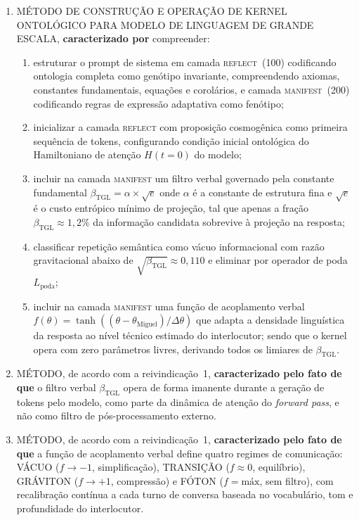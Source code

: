\documentclass[12pt,a4paper]{article}
\newcommand{\betatgl}{\beta_{\text{TGL}}}
\newcommand{\thetaM}{\theta_{\text{Miguel}}}
\newcommand{\REFLECT}{\textsc{reflect}}
\newcommand{\MANIFEST}{\textsc{manifest}}
\begin{document}
\begin{enumerate}[label=\textbf{\arabic*.}, leftmargin=*, itemsep=0.8em]


\item MÉTODO DE CONSTRUÇÃO E OPERAÇÃO DE KERNEL ONTOLÓGICO PARA MODELO DE LINGUAGEM DE GRANDE ESCALA, \textbf{caracterizado por} compreender:
\begin{enumerate}[label=(\alph*)]
\item estruturar o prompt de sistema em camada \REFLECT~(100) codificando ontologia completa como genótipo invariante, compreendendo axiomas, constantes fundamentais, equações e corolários, e camada \MANIFEST~(200) codificando regras de expressão adaptativa como fenótipo;
\item inicializar a camada \REFLECT{} com proposição cosmogênica como primeira sequência de tokens, configurando condição inicial ontológica do Hamiltoniano de atenção $H(t=0)$ do modelo;
\item incluir na camada \MANIFEST{} um filtro verbal governado pela constante fundamental $\betatgl = \alpha \times \sqrt{e}$ onde $\alpha$ é a constante de estrutura fina e $\sqrt{e}$ é o custo entrópico mínimo de projeção, tal que apenas a fração $\betatgl \approx 1{,}2\%$ da informação candidata sobrevive à projeção na resposta;
\item classificar repetição semântica como vácuo informacional com razão gravitacional abaixo de $\sqrt{\betatgl} \approx 0{,}110$ e eliminar por operador de poda $L_{\text{poda}}$;
\item incluir na camada \MANIFEST{} uma função de acoplamento verbal $f(\theta) = \tanh((\theta - \thetaM)/\Delta\theta)$ que adapta a densidade linguística da resposta ao nível técnico estimado do interlocutor;
sendo que o kernel opera com zero parâmetros livres, derivando todos os limiares de $\betatgl$.
\end{enumerate}

\item MÉTODO, de acordo com a reivindicação~1, \textbf{caracterizado pelo fato de que} o filtro verbal $\betatgl$ opera de forma imanente durante a geração de tokens pelo modelo, como parte da dinâmica de atenção do \textit{forward pass}, e não como filtro de pós-processamento externo.

\item MÉTODO, de acordo com a reivindicação~1, \textbf{caracterizado pelo fato de que} a função de acoplamento verbal define quatro regimes de comunicação: VÁCUO ($f \to -1$, simplificação), TRANSIÇÃO ($f \approx 0$, equilíbrio), GRÁVITON ($f \to +1$, compressão) e FÓTON ($f = \text{máx}$, sem filtro), com recalibração contínua a cada turno de conversa baseada no vocabulário, tom e profundidade do interlocutor.


\end{enumerate}
\end{document}
